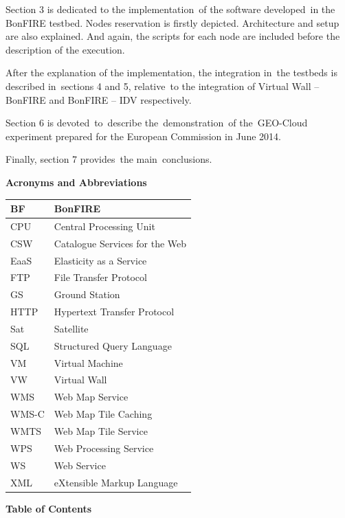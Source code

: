 \documentclass[a4paper]{article}
\begin{document}
\bigskip

Section 3 is dedicated to the implementation\ of the software
developed\ in the BonFIRE testbed. Nodes reservation is firstly
depicted. Architecture and setup are also explained. And again, the
scripts for each node are included before the description of the
execution.


\bigskip

After the explanation of the implementation, the integration in\ the
testbeds is described in\ sections 4 and 5, relative\ to the
integration of Virtual Wall -- BonFIRE and BonFIRE -- IDV respectively.


\bigskip

Section 6 is devoted\ to\ describe the\ demonstration\ of the\ GEO-Cloud
experiment prepared for the European Commission in June 2014.


\bigskip

Finally, section 7 provides\ the main\ conclusions.


\bigskip

\clearpage
\textrm{\textbf{A}}\textrm{\textbf{cronyms and
A}}\textrm{\textbf{bbreviations}}


\bigskip

\begin{flushleft}
\tablehead{}
\begin{supertabular}{|m{0.8823598in}|m{5.35596in}|}
\hline
BF &
BonFIRE\\\hline
CPU &
Central Processing Unit\\\hline
CSW &
Catalogue Services for the Web\\\hline
EaaS &
Elasticity as a Service\\\hline
FTP &
File Transfer Protocol\\\hline
GS &
Ground Station\\\hline
HTTP &
Hypertext Transfer Protocol\\\hline
Sat &
Satellite\\\hline
SQL &
Structured Query Language\\\hline
VM &
Virtual Machine\\\hline
VW &
Virtual Wall\\\hline
WMS &
Web Map Service\\\hline
WMS-C &
Web Map Tile Caching\\\hline
WMTS &
Web Map Tile Service\\\hline
WPS &
Web Processing Service\\\hline
WS &
Web Service\\\hline
XML &
eXtensible Markup Language\\\hline
\end{supertabular}
\end{flushleft}
\clearpage
\textrm{\textbf{Table of C}}\textrm{\textbf{ontents}}
\end{document}
